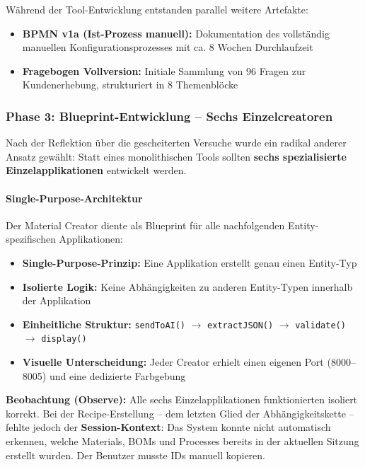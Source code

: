 Während der Tool-Entwicklung entstanden parallel weitere Artefakte:

\begin{itemize}
    \item \textbf{BPMN v1a (Ist-Prozess manuell):} Dokumentation des vollständig manuellen Konfigurationsprozesses mit ca. 8 Wochen Durchlaufzeit
    \item \textbf{Fragebogen Vollversion:} Initiale Sammlung von 96 Fragen zur Kundenerhebung, strukturiert in 8 Themenblöcke
\end{itemize}


\subsubsection{Phase 3: Blueprint-Entwicklung -- Sechs Einzelcreatoren}
\label{subsubsec:Phase3}

Nach der Reflektion über die gescheiterten Versuche wurde ein radikal anderer Ansatz gewählt: Statt eines monolithischen Tools sollten \textbf{sechs spezialisierte Einzelapplikationen} entwickelt werden.

\paragraph{Single-Purpose-Architektur}

Der Material Creator diente als Blueprint für alle nachfolgenden Entity-spezifischen Applikationen:

\begin{itemize}
    \item \textbf{Single-Purpose-Prinzip:} Eine Applikation erstellt genau einen Entity-Typ
    \item \textbf{Isolierte Logik:} Keine Abhängigkeiten zu anderen Entity-Typen innerhalb der Applikation
    \item \textbf{Einheitliche Struktur:} \texttt{sendToAI()} $\rightarrow$ \texttt{extractJSON()} $\rightarrow$ \texttt{validate()} $\rightarrow$ \texttt{display()}
    \item \textbf{Visuelle Unterscheidung:} Jeder Creator erhielt einen eigenen Port (8000--8005) und eine dedizierte Farbgebung
\end{itemize}

\textbf{Beobachtung (Observe):} Alle sechs Einzelapplikationen funktionierten isoliert korrekt. Bei der Recipe-Erstellung -- dem letzten Glied der Abhängigkeitskette -- fehlte jedoch der \textbf{Session-Kontext}: Das System konnte nicht automatisch erkennen, welche Materials, BOMs und Processes bereits in der aktuellen Sitzung erstellt wurden. Der Benutzer musste IDs manuell kopieren.

